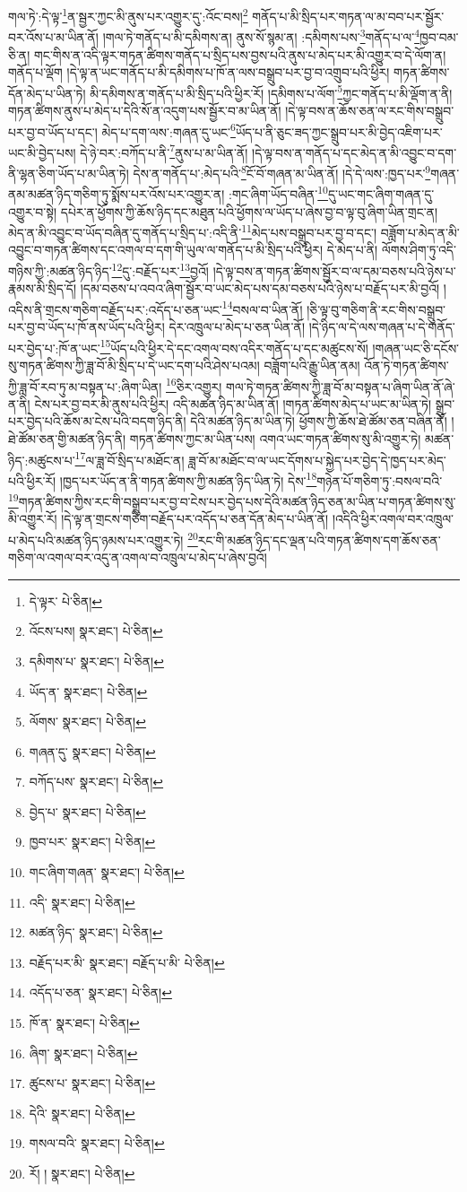 གལ་ཏེ་:དེ་ལྟ་\footnote{དེ་ལྟར་  པེ་ཅིན། }ན་སྦྱར་ཀྱང་མི་ནུས་པར་འགྱུར་དུ་:འོང་བས།\footnote{འོངས་པས།  སྣར་ཐང་།  པེ་ཅིན། } གནོད་པ་མི་སྲིད་པར་གཏན་ལ་མ་བབ་པར་སྦྱོར་བར་འོས་པ་མ་ཡིན་ནོ། །གལ་ཏེ་གནོད་པ་མི་དམིགས་ན། ནུས་སོ་སྙམ་ན། :དམིགས་པས་\footnote{དམིགས་པ་  སྣར་ཐང་།  པེ་ཅིན། }གནོད་པ་ལ་\footnote{ཡོད་ན་  སྣར་ཐང་།  པེ་ཅིན། }ཁྱབ་བམ་ཅི་ན། གང་གིས་ན་འདི་ལྟར་གཏན་ཚིགས་གནོད་པ་སྲིད་པས་བྱས་པའི་ནུས་པ་མེད་པར་མི་འགྱུར་བ་དེ་ལོག་ན། གནོད་པ་ལྡོག །དེ་ལྟ་ན་ཡང་གནོད་པ་མི་དམིགས་པ་ཁོ་ན་ལས་བསྒྲུབ་པར་བྱ་བ་འགྲུབ་པའི་ཕྱིར། གཏན་ཚིགས་དོན་མེད་པ་ཡིན་ཏེ། མི་དམིགས་ན་གནོད་པ་མི་སྲིད་པའི་ཕྱིར་རོ། །དམིགས་པ་ལོག་\footnote{ལོགས་  སྣར་ཐང་།  པེ་ཅིན། }ཀྱང་གནོད་པ་མི་ལྡོག་ན་ནི། གཏན་ཚིགས་ནུས་པ་མེད་པ་དེའི་སོ་ན་འདུག་པས་སྦྱོར་བ་མ་ཡིན་ནོ། །དེ་ལྟ་བས་ན་ཆོས་ཅན་ལ་རང་གིས་བསྒྲུབ་པར་བྱ་བ་ཡོད་པ་དང་། མེད་པ་དག་ལས་:གཞན་དུ་ཡང་\footnote{གཞན་དུ་  སྣར་ཐང་།  པེ་ཅིན། }ཡོད་པ་ནི་ཅུང་ཟད་ཀྱང་སྒྲུབ་པར་མི་བྱེད་འཇིག་པར་ཡང་མི་བྱེད་པས། དེ་ཉེ་བར་:བཀོད་པ་ནི་\footnote{བཀོད་པས་  སྣར་ཐང་།  པེ་ཅིན། }ནུས་པ་མ་ཡིན་ནོ། །དེ་ལྟ་བས་ན་གནོད་པ་དང་མེད་ན་མི་འབྱུང་བ་དག་ནི་ལྷན་ཅིག་ཡོད་པ་མ་ཡིན་ཏེ། དེས་ན་གནོད་པ་:མེད་པའི་\footnote{བྱེད་པ་  སྣར་ཐང་།  པེ་ཅིན། }ངོ་བོ་གཞན་མ་ཡིན་ནོ། །དེ་དེ་ལས་:ཁྱད་པར་\footnote{ཁྱབ་པར་  སྣར་ཐང་།  པེ་ཅིན། }གཞན་ནམ་མཚན་ཉིད་གཅིག་ཏུ་སྨོས་པར་འོས་པར་འགྱུར་ན། :གང་ཞིག་ཡོད་བཞིན་\footnote{གང་ཞིག་གཞན་  སྣར་ཐང་།  པེ་ཅིན། }དུ་ཡང་གང་ཞིག་གཞན་དུ་འགྱུར་བ་སྟེ། དཔེར་ན་ཕྱོགས་ཀྱི་ཆོས་ཉིད་དང་མཐུན་པའི་ཕྱོགས་ལ་ཡོད་པ་ཞེས་བྱ་བ་ལྟ་བུ་ཞིག་ཡིན་གྲང་ན། མེད་ན་མི་འབྱུང་བ་ཡོད་བཞིན་དུ་གནོད་པ་སྲིད་པ་:འདི་ནི་\footnote{འདི་  སྣར་ཐང་།  པེ་ཅིན། }མེད་པས་བསྒྲུབ་པར་བྱ་བ་དང་། བཟློག་པ་མེད་ན་མི་འབྱུང་བ་གཏན་ཚིགས་དང་འགལ་བ་དག་གི་ཡུལ་ལ་གནོད་པ་མི་སྲིད་པའི་ཕྱིར། དེ་མེད་པ་ནི། ལོགས་ཤིག་ཏུ་འདི་གཉིས་ཀྱི་:མཚན་ཉིད་ཉིད་\footnote{མཚན་ཉིད་  སྣར་ཐང་།  པེ་ཅིན། }དུ་:བརྗོད་པར་\footnote{བརྗོད་པར་མི་  སྣར་ཐང་། བརྗོད་པ་མི་  པེ་ཅིན། }བྱའོ། །དེ་ལྟ་བས་ན་གཏན་ཚིགས་སྦྱོར་བ་ལ་དམ་བཅས་པའི་ཉེས་པ་རྣམས་མི་སྲིད་དོ། །དམ་བཅས་པ་འབའ་ཞིག་སྦྱོར་བ་ཡང་མེད་པས་དམ་བཅས་པའི་ཉེས་པ་བརྗོད་པར་མི་བྱའོ། །འདིས་ནི་གྲངས་གཅིག་བརྗོད་པར་:འདོད་པ་ཅན་ཡང་\footnote{འདོད་པ་ཅན་  སྣར་ཐང་།  པེ་ཅིན། }བསལ་བ་ཡིན་ནོ། །ཅི་ལྟ་བུ་གཅིག་ནི་རང་གིས་བསྒྲུབ་པར་བྱ་བ་ཡོད་པ་ཁོ་ནས་ཡོད་པའི་ཕྱིར། དེར་འཁྲུལ་པ་མེད་པ་ཅན་ཡིན་ནོ། །དེ་ཉིད་ལ་དེ་ལས་གཞན་པ་དེ་གནོད་པར་བྱེད་པ་:ཁོ་ན་ཡང་\footnote{ཁོ་ན་  སྣར་ཐང་།  པེ་ཅིན། }ཡོད་པའི་ཕྱིར་དེ་དང་འགལ་བས་འདིར་གནོད་པ་དང་མཚུངས་སོ། །གཞན་ཡང་ཅི་དངོས་སུ་གཏན་ཚིགས་ཀྱི་ཟླ་བོ་མི་སྲིད་པ་དེ་ཡང་དག་པའི་ཤེས་པའམ། བཟློག་པའི་རྒྱུ་ཡིན་ནམ། འོན་ཏེ་གཏན་ཚིགས་ཀྱི་ཟླ་བོ་རབ་ཏུ་མ་བསྟན་པ་:ཞིག་ཡིན། \footnote{ཞིག་  སྣར་ཐང་།  པེ་ཅིན། }ཅིར་འགྱུར། གལ་ཏེ་གཏན་ཚིགས་ཀྱི་ཟླ་བོ་མ་བསྟན་པ་ཞིག་ཡིན་ནོ་ཞེ་ན་ནི། ངེས་པར་བྱ་བར་མི་ནུས་པའི་ཕྱིར། འདི་མཚན་ཉིད་མ་ཡིན་ནོ། །གཏན་ཚིགས་མེད་པ་ཡང་མ་ཡིན་ཏེ། སྒྲུབ་པར་བྱེད་པའི་ཆོས་མ་ངེས་པའི་བདག་ཉིད་ནི། དེའི་མཚན་ཉིད་མ་ཡིན་ཏེ། ཕྱོགས་ཀྱི་ཆོས་ཐེ་ཚོམ་ཅན་བཞིན་ནོ། །ཐེ་ཚོམ་ཅན་གྱི་མཚན་ཉིད་ནི། གཏན་ཚིགས་ཀྱང་མ་ཡིན་པས། འགའ་ཡང་གཏན་ཚིགས་སུ་མི་འགྱུར་ཏེ། མཚན་ཉིད་:མཚུངས་པ་\footnote{ཚུངས་པ་  སྣར་ཐང་།  པེ་ཅིན། }ལ་ཟླ་བོ་སྲིད་པ་མཐོང་ན། ཟླ་བོ་མ་མཐོང་བ་ལ་ཡང་དོགས་པ་སྐྱེད་པར་བྱེད་དེ་ཁྱད་པར་མེད་པའི་ཕྱིར་རོ། །ཁྱད་པར་ཡོད་ན་ནི་གཏན་ཚིགས་ཀྱི་མཚན་ཉིད་ཡིན་ཏེ། དེས་\footnote{དེའི་  སྣར་ཐང་།  པེ་ཅིན། }གཉེན་པོ་གཅིག་ཏུ་:བསལ་བའི་\footnote{གསལ་བའི་  སྣར་ཐང་།  པེ་ཅིན། }གཏན་ཚིགས་ཀྱིས་རང་གི་བསྒྲུབ་པར་བྱ་བ་ངེས་པར་བྱེད་པས་དེའི་མཚན་ཉིད་ཅན་མ་ཡིན་པ་གཏན་ཚིགས་སུ་མི་འགྱུར་རོ། །དེ་ལྟ་ན་གྲངས་གཅིག་བརྗོད་པར་འདོད་པ་ཅན་དོན་མེད་པ་ཡིན་ནོ། །འདིའི་ཕྱིར་འགལ་བར་འཁྲུལ་པ་མེད་པའི་མཚན་ཉིད་ཉམས་པར་འགྱུར་ཏེ། \footnote{རོ། །   སྣར་ཐང་།  པེ་ཅིན། }རང་གི་མཚན་ཉིད་དང་ལྡན་པའི་གཏན་ཚིགས་དག་ཆོས་ཅན་གཅིག་ལ་འགལ་བར་འདུ་ན་འགལ་བ་འཁྲུལ་པ་མེད་པ་ཞེས་བྱའོ། 